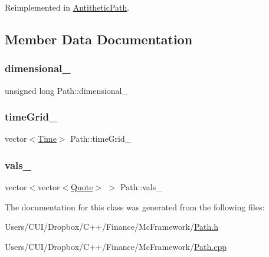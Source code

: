 Reimplemented in \hyperlink{class_antithetic_path_ad15cfc2a074fd27bd3119ddafa24c3bd}{Antithetic\+Path}.



\subsection{Member Data Documentation}
\hypertarget{class_path_a577d3370c9142a9e73c2118799c6a8a2}{}\label{class_path_a577d3370c9142a9e73c2118799c6a8a2} 
\subsubsection{\texorpdfstring{dimensional\+\_\+}{dimensional\_}}
{\footnotesize\ttfamily unsigned long Path\+::dimensional\+\_\+\hspace{0.3cm}{\ttfamily [private]}}

\hypertarget{class_path_a89dcf892f7c979692e1bdb12811a2db1}{}\label{class_path_a89dcf892f7c979692e1bdb12811a2db1} 
\subsubsection{\texorpdfstring{time\+Grid\+\_\+}{timeGrid\_}}
{\footnotesize\ttfamily vector$<$\hyperlink{_name_def_8h_ac2d3e0ba793497bcca555c7c2cf64ff3}{Time}$>$ Path\+::time\+Grid\+\_\+\hspace{0.3cm}{\ttfamily [private]}}

\hypertarget{class_path_ac8b906724bca24f9ec14ad754559e27a}{}\label{class_path_ac8b906724bca24f9ec14ad754559e27a} 
\subsubsection{\texorpdfstring{vals\+\_\+}{vals\_}}
{\footnotesize\ttfamily vector$<$vector$<$\hyperlink{_name_def_8h_a642a6c5fd87319d922637de0e0bb0305}{Quote}$>$ $>$ Path\+::vals\+\_\+\hspace{0.3cm}{\ttfamily [private]}}



The documentation for this class was generated from the following files\+:\begin{DoxyCompactItemize}
\item 
Users/\+C\+U\+I/\+Dropbox/\+C++/\+Finance/\+Mc\+Framework/\hyperlink{_path_8h}{Path.\+h}\item 
Users/\+C\+U\+I/\+Dropbox/\+C++/\+Finance/\+Mc\+Framework/\hyperlink{_path_8cpp}{Path.\+cpp}\end{DoxyCompactItemize}
